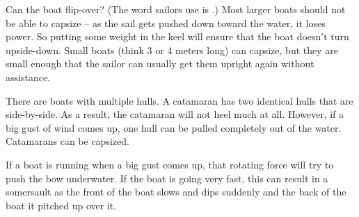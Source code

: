 Can the boat flip-over?  (The word sailors use is .)  Most larger boats should not be able to capsize -- as the sail gets pushed down toward the water,  it loses power.  So putting some weight in the keel will ensure that the boat doesn't turn upside-down.  Small boats (think 3 or 4 meters long) can capsize,  but they are small enough that the sailor can usually
get them upright again without assistance.

There are boats with multiple hulls.   A catamaran has two identical hulls that are side-by-side.  As a result,  the catamaran will not heel much at all.  However,  if a big gust of wind comes up, one hull can be pulled completely out of the water.  Catamarans can be capsized.

If a boat is running when a big gust comes up,  that rotating force will try to push the bow underwater.   If the boat is going very fast,  this can result in a somersault as 
the front of the boat slows and dips suddenly and the back of the boat it pitched up over it.


